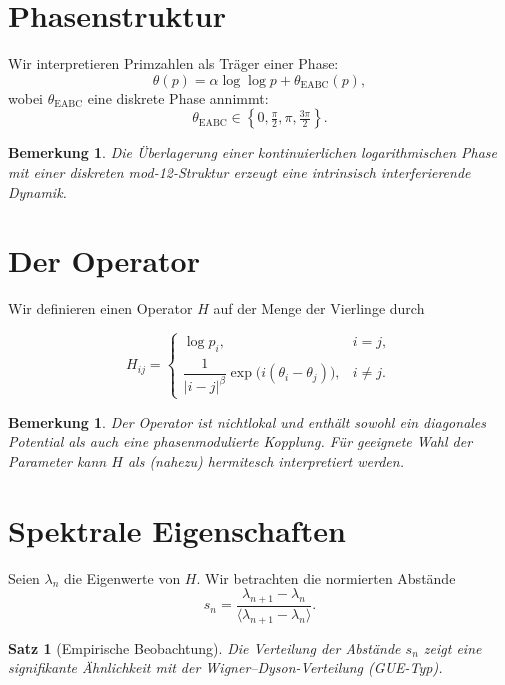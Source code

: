 \documentclass[11pt,a4paper]{article}
\newtheorem{satz}[definition]{Satz}
\newtheorem{bemerkung}[definition]{Bemerkung}
\begin{document}
	\section{Phasenstruktur}
	
	Wir interpretieren Primzahlen als Träger einer Phase:
	\begin{equation}
		\theta(p) = \alpha \log\log p + \theta_{\mathrm{EABC}}(p),
	\end{equation}
	wobei $\theta_{\mathrm{EABC}}$ eine diskrete Phase annimmt:
	\[
	\theta_{\mathrm{EABC}} \in \left\{0, \tfrac{\pi}{2}, \pi, \tfrac{3\pi}{2}\right\}.
	\]
	
	\begin{bemerkung}
		Die Überlagerung einer kontinuierlichen logarithmischen Phase mit einer diskreten mod-12-Struktur erzeugt eine intrinsisch interferierende Dynamik.
	\end{bemerkung}
	
	\section{Der Operator}
	
	Wir definieren einen Operator $H$ auf der Menge der Vierlinge durch
	
	\begin{equation}
		H_{ij} =
		\begin{cases}
			\log p_i, & i=j, \\[6pt]
			\dfrac{1}{|i-j|^\beta}
			\exp\bigl(i(\theta_i - \theta_j)\bigr), & i \neq j.
		\end{cases}
	\end{equation}
	
	\begin{bemerkung}
		Der Operator ist nichtlokal und enthält sowohl ein diagonales Potential als auch eine phasenmodulierte Kopplung.
		Für geeignete Wahl der Parameter kann $H$ als (nahezu) hermitesch interpretiert werden.
	\end{bemerkung}
	
	\section{Spektrale Eigenschaften}
	
	Seien $\lambda_n$ die Eigenwerte von $H$. Wir betrachten die normierten Abstände
	\[
	s_n = \frac{\lambda_{n+1} - \lambda_n}{\langle \lambda_{n+1} - \lambda_n \rangle}.
	\]
	
	\begin{satz}[Empirische Beobachtung]
		Die Verteilung der Abstände $s_n$ zeigt eine signifikante Ähnlichkeit mit der Wigner--Dyson-Verteilung (GUE-Typ).
	\end{satz}
	
\end{document}
